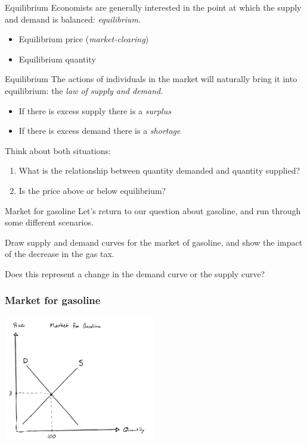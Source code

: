 \documentclass[aspectratio=169]{beamer}
\begin{document}
 \begin{frame}{Equilibrium}
    Economists are generally interested in the point at which the supply and demand is balanced: \textit{equilibrium}.
    \begin{itemize}
        \item Equilibrium price (\textit{market-clearing})
        \item Equilibrium quantity
    \end{itemize}
\end{frame}

\begin{frame}{Equilibrium}
    The actions of individuals in the market will naturally bring it into equilibrium: the \textit{law of supply and demand}.
    \begin{itemize}
        \item If there is excess supply there is a \textit{surplus}
        \item If there is excess demand there is a \textit{shortage}
    \end{itemize}

    Think about both situations:
    \begin{enumerate}
        \item What is the relationship between quantity demanded and quantity supplied?
        \item Is the price above or below equilibrium?
    \end{enumerate}
\end{frame}

\begin{frame}{Market for gasoline}
    Let's return to our question about gasoline, and run through some different scenarios.

    \medskip

    Draw supply and demand curves for the market of gasoline, and show the impact of the decrease in the gas tax.

    \medskip

    Does this represent a change in the demand curve or the supply curve?
\end{frame}

\begin{frame}
    \frametitle{Market for gasoline}
    \centering
    \includegraphics[width = 0.5\textwidth,keepaspectratio]{market_for_gas.png}
\end{frame}
\end{document}
